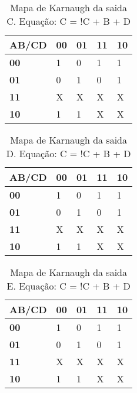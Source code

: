 \documentclass[12pts]{article}
\begin{document}
\singlespacing

\begin{table}[h]
\begin{center}
	\begin{tabular}{|l|l|l|l|l|}
		\hline
		\textbf{AB/CD} & \textbf{00} & \textbf{01} & \textbf{11} & \textbf{10}\\
		\hline
		\textbf{00} & 1 & 0 & 1 & 1\\
		\hline
		\textbf{01} & 0 & 1 & 0 & 1\\
		\hline
		\textbf{11} & X & X & X & X\\
		\hline
		\textbf{10} & 1 & 1 & X & X\\
		\hline
	\end{tabular}
\end{center}
	\caption{Mapa de Karnaugh da saida C. Equação: C = !C + B + D }
	\end{table}
	\singlespacing
	
\begin{table}[h]
\begin{center}
	\begin{tabular}{|l|l|l|l|l|}
		\hline
		\textbf{AB/CD} & \textbf{00} & \textbf{01} & \textbf{11} & \textbf{10}\\
		\hline
		\textbf{00} & 1 & 0 & 1 & 1\\
		\hline
		\textbf{01} & 0 & 1 & 0 & 1\\
		\hline
		\textbf{11} & X & X & X & X\\
		\hline
		\textbf{10} & 1 & 1 & X & X\\
		\hline
	\end{tabular}
\end{center}
	\caption{Mapa de Karnaugh da saida D. Equação: C = !C + B + D }
	\end{table}
	\singlespacing
	
\begin{table}[h]
\begin{center}
	\begin{tabular}{|l|l|l|l|l|}
		\hline
		\textbf{AB/CD} & \textbf{00} & \textbf{01} & \textbf{11} & \textbf{10}\\
		\hline
		\textbf{00} & 1 & 0 & 1 & 1\\
		\hline
		\textbf{01} & 0 & 1 & 0 & 1\\
		\hline
		\textbf{11} & X & X & X & X\\
		\hline
		\textbf{10} & 1 & 1 & X & X\\
		\hline
	\end{tabular}
\end{center}
	\caption{Mapa de Karnaugh da saida E. Equação: C = !C + B + D }
	\end{table}
	\singlespacing
\end{document}
